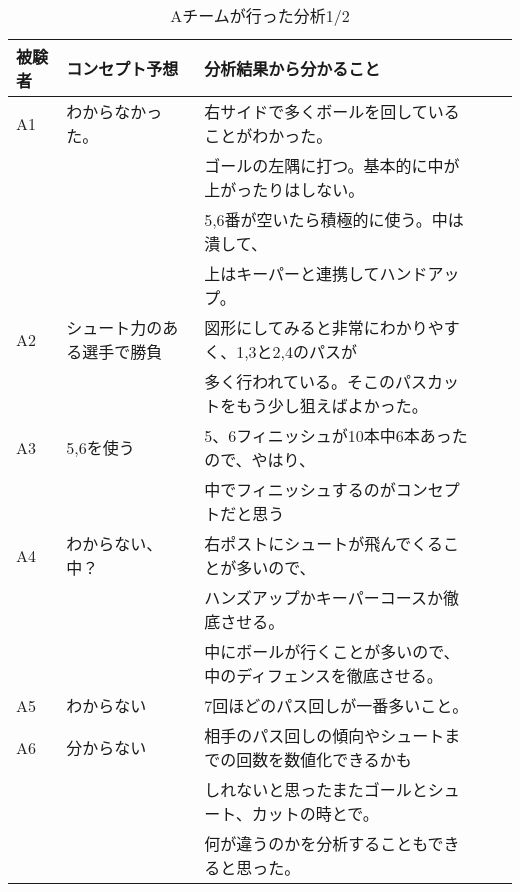\documentclass[../main.tex]{subfiles}
\begin{document}
  \begin{table}[h]
    \caption{Aチームが行った分析1/2}\label{table:青の分析内容一つ目}
    \centering
    \begin{tabular}{lllll}
      \hline \hline
      被験者 & コンセプト予想 & 分析結果から分かること \\
      \hline \hline
      A1 & わからなかった。& 右サイドで多くボールを回していることがわかった。\\
      &&ゴールの左隅に打つ。基本的に中が上がったりはしない。\\
      &&5,6番が空いたら積極的に使う。中は潰して、\\
      &&上はキーパーと連携してハンドアップ。\\
      A2 &シュート力のある選手で勝負&図形にしてみると非常にわかりやすく、1,3と2,4のパスが\\
      &&多く行われている。そこのパスカットをもう少し狙えばよかった。\\
      A3 & 5,6を使う & 5、6フィニッシュが10本中6本あったので、やはり、 \\
      &&中でフィニッシュするのがコンセプトだと思う\\
      A4 & わからない、中？ & 右ポストにシュートが飛んでくることが多いので、\\
      &&ハンズアップかキーパーコースか徹底させる。\\
      &&中にボールが行くことが多いので、中のディフェンスを徹底させる。\\
      A5 & わからない & 7回ほどのパス回しが一番多いこと。 \\
      A6 & 分からない & 相手のパス回しの傾向やシュートまでの回数を数値化できるかも\\
      &&しれないと思ったまたゴールとシュート、カットの時とで。\\
      &&何が違うのかを分析することもできると思った。 \\
      \hline
    \end{tabular}
    \end{table}
\end{document}
